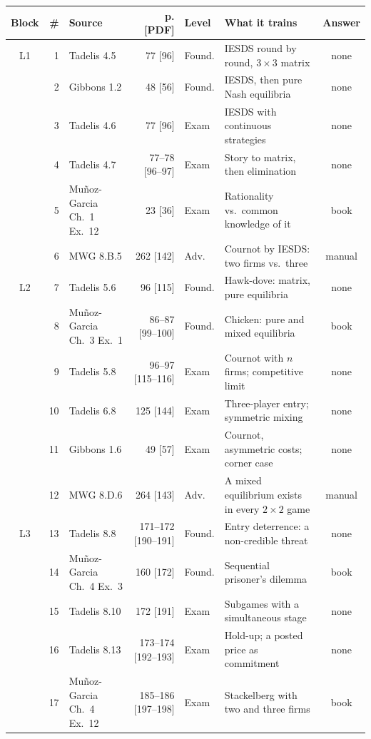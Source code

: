 \documentclass[11pt,a4paper]{article}
\begin{document}
\medskip
\begin{center}
\footnotesize
\setlength{\tabcolsep}{3.5pt}
\begin{tabular}{@{}c r l r l >{\raggedright\arraybackslash}p{5.4cm} c@{}}
\toprule
Block & \# & Source & p. [PDF] & Level & What it trains & Answer \\
\midrule
L1 & 1 & Tadelis 4.5 & 77 [96] & Found. & IESDS round by round, $3\times3$ matrix & none \\
   & 2 & Gibbons 1.2 & 48 [56] & Found. & IESDS, then pure Nash equilibria & none \\
   & 3 & Tadelis 4.6 & 77 [96] & Exam & IESDS with continuous strategies & none \\
   & 4 & Tadelis 4.7 & 77--78 [96--97] & Exam & Story to matrix, then elimination & none \\
   & 5 & Muñoz-Garcia Ch.~1 Ex.~12 & 23 [36] & Exam & Rationality vs.\ common knowledge of it & book \\
   & 6 & MWG 8.B.5 & 262 [142] & Adv. & Cournot by IESDS: two firms vs.\ three & manual \\
\midrule
L2 & 7 & Tadelis 5.6 & 96 [115] & Found. & Hawk-dove: matrix, pure equilibria & none \\
   & 8 & Muñoz-Garcia Ch.~3 Ex.~1 & 86--87 [99--100] & Found. & Chicken: pure and mixed equilibria & book \\
   & 9 & Tadelis 5.8 & 96--97 [115--116] & Exam & Cournot with $n$ firms; competitive limit & none \\
   & 10 & Tadelis 6.8 & 125 [144] & Exam & Three-player entry; symmetric mixing & none \\
   & 11 & Gibbons 1.6 & 49 [57] & Exam & Cournot, asymmetric costs; corner case & none \\
   & 12 & MWG 8.D.6 & 264 [143] & Adv. & A mixed equilibrium exists in every $2\times2$ game & manual \\
\midrule
L3 & 13 & Tadelis 8.8 & 171--172 [190--191] & Found. & Entry deterrence: a non-credible threat & none \\
   & 14 & Muñoz-Garcia Ch.~4 Ex.~3 & 160 [172] & Found. & Sequential prisoner's dilemma & book \\
   & 15 & Tadelis 8.10 & 172 [191] & Exam & Subgames with a simultaneous stage & none \\
   & 16 & Tadelis 8.13 & 173--174 [192--193] & Exam & Hold-up; a posted price as commitment & none \\
   & 17 & Muñoz-Garcia Ch.~4 Ex.~12 & 185--186 [197--198] & Exam & Stackelberg with two and three firms & book \\

\end{tabular}
\end{center}
\end{document}

